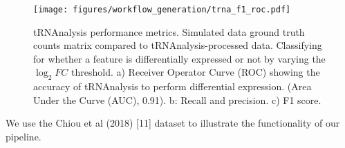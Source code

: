 \begin{figure}[htb]
\centering
\texttt{[image: figures/workflow\_generation/trna\_f1\_roc.pdf]}
\caption[tRNAnalysis performance metrics]{tRNAnalysis performance metrics.
Simulated data ground truth counts matrix compared to tRNAnalysis-processed data.
Classifying for whether a feature is differentially expressed or not by varying the $\log_{2}FC$ threshold.
a) Receiver Operator Curve (ROC) showing the accuracy of tRNAnalysis to perform differential expression. (Area Under the Curve (AUC), 0.91).
b: Recall and precision.
c) F1 score.}
\label{fig:trna_f1_roc}
\end{figure}

We use the Chiou et al (2018) [11] dataset to illustrate the functionality of our pipeline.